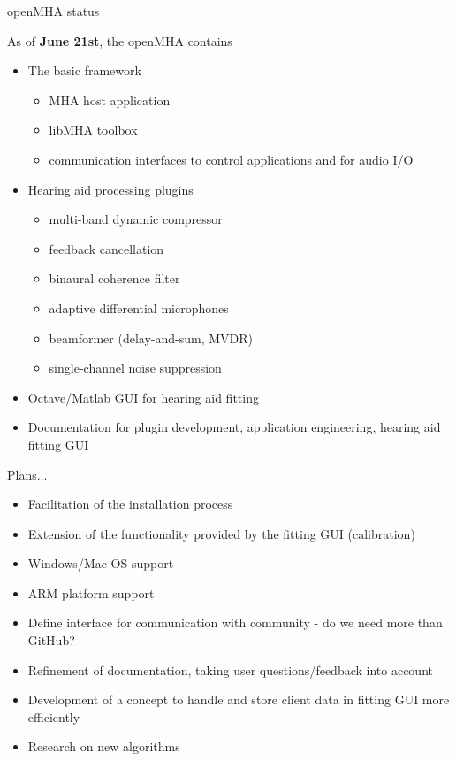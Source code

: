 \documentclass[10pt,hyperref={pdfpagelabels=false},aspectratio=169]{beamer}
\date{20/06/2017}  %
\begin{document}

\begin{frame}{openMHA status}

As of \textbf{June 21st}, the openMHA contains

\begin{itemize}
	\item The basic framework
		\begin{itemize}
			\item MHA host application
			\item libMHA toolbox
			\item communication interfaces to control applications and for audio I/O
		\end{itemize}
			\item Hearing aid processing plugins
		\begin{itemize}
			\item multi-band dynamic compressor
			\item feedback cancellation
			\item binaural coherence filter
			\item adaptive differential microphones 
			\item beamformer (delay-and-sum, MVDR)
			\item single-channel noise suppression
		\end{itemize}
		\item Octave/Matlab GUI for hearing aid fitting 
		\item Documentation for plugin development, application engineering, hearing aid fitting GUI
\end{itemize}


\end{frame}

\begin{frame}{Plans...}
\begin{itemize}
	\item Facilitation of the installation process
	\item Extension of the functionality provided by the fitting GUI (calibration)
	\item Windows/Mac OS support
	\item ARM platform support
	\item Define interface for communication with community - do we need more than GitHub?
	\item Refinement of documentation, taking user questions/feedback into account
	\item Development  of a concept to handle and store client data in fitting GUI more efficiently
	\item Research on new algorithms 
\end{itemize}


\end{frame}
\end{document}
